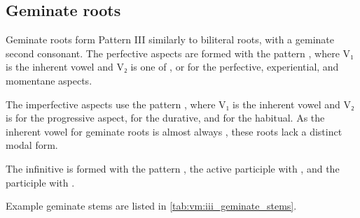 \documentclass[grammar]{subfiles}
\begin{document}
\subsection{Geminate roots}
\label{ssec:vm:iii_geminate_roots}

Geminate roots form Pattern III similarly to biliteral roots, with a geminate
second consonant.  The perfective aspects are formed with the pattern
, where V₁ is the inherent vowel and V₂ is one of ,
 or  for the perfective, experiential, and momentane aspects.  

The imperfective aspects use the pattern , where V₁ is the
inherent vowel and V₂ is  for the progressive aspect,  for the
durative, and  for the habitual. As the inherent vowel for geminate
roots is almost always , these roots lack a distinct modal form.

The infinitive is formed with the pattern , the active participle
with , and the participle with .  

Example geminate stems are listed in \cref{tab:vm:iii_geminate_stems}.

\begin{table}[h!]\small\capstart
  \centering
  \\
  \caption{Pattern III geminate stems \label{tab:vm:iii_geminate_stems}}
\end{table}
\end{document}
